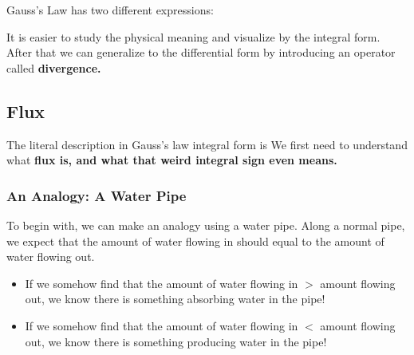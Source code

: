 \documentclass[class=article, crop=false, 12pt]{standalone}
\begin{document}
Gauss's Law has two different expressions:

It is easier to study the physical meaning and visualize by the integral form.
After that we can generalize to the differential form by introducing an operator called \bf{divergence}.

\subsection{Flux}

The literal description in Gauss's law integral form is
We first need to understand what \bf{flux} is, 
and what that weird integral sign even means.

\subsubsection{An Analogy: A Water Pipe}

To begin with, we can make an analogy using a water pipe.
Along a normal pipe, we expect that the amount of water flowing in
should equal to the amount of water flowing out.


\begin{itemize}
    \item If we somehow find that the amount of water flowing in $>$ amount flowing out,
    we know there is something absorbing water in the pipe! 


    \item If we somehow find that the amount of water flowing in $<$ amount flowing out,
    we know there is something producing water in the pipe! 


\end{itemize}
\end{document}
